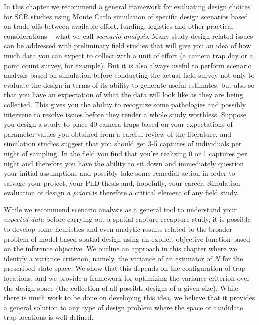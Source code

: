In this chapter we recommend a general framework for evaluating
design choices for SCR studies using Monte Carlo simulation
of specific design scenarios 
based on trade-offs between available effort, funding, logistics and
other practical considerations -- what we call {\it scenario analysis}. 
Many study design related issues can be
addressed with preliminary field studies that will give you an idea of
how much data you can expect to collect with a unit of effort (a
camera trap day or a point count survey, for example).  But it is also
always useful to perform scenario analysis based on simulation before
conducting the actual field survey not only to evaluate the design in
terms of its ability to generate useful estimates,
but also so that you have an expectation of what the data will look
like as they are being collected. This gives you the ability to
recognize some pathologies and possibly intervene to resolve issues
before they render a whole study worthless. Suppose you design a study
to place 40 camera traps based on your expectations of parameter
values you obtained from a careful review of the literature, and
simulation studies suggest that you should get 3-5 captures of
individuals per night of sampling. In the field you find that you're
realizing 0 or 1 captures per night and therefore you have the ability
to sit down and immediately question your initial assumptions and
possibly take some remedial action in order to salvage your project,
your PhD thesis and, hopefully, your career. 
Simulation evaluation of design {\it a priori} is therefore a critical
element of any field study.

While we recommend scenario analysis as a general tool to understand
your {\it expected data} before carrying out a spatial
capture-recapture study, it is possible to develop some heuristics and
even analytic results related to the
broader problem of model-based spatial design
\citep{muller:2007} using an explicit objective function based on the
inference objective.  
We outline an approach in this chapter where we identify a variance
criterion, namely, the variance of an estimator of $N$ for the
prescribed state-space. We show that this depends on the configuration
of trap locations, and we provide a framework for optimizing the
variance criterion over the design space (the collection of all
possible designs of a given size). While there is much work to be done
on developing this idea, we believe that it provides a general
solution to any type of design problem where the space of candidate
trap locations is well-defined.


